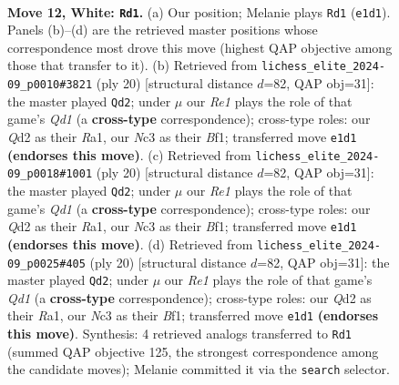 \documentclass[11pt]{article}
\begin{document}
\clearpage

\begin{figure}[p]\centering
\begin{subfigure}{0.46\textwidth}\centering
\resizebox{\linewidth}{!}{%
\newchessgame
\chessboard[
  setfen={rnb1r2k/p2nqppp/1pp1p3/3pP3/3P4/2N5/PPPQ1PPP/2K1RBNR w - - 0 12},
  showmover=false,
  pgfstyle=straightmove, color=movearrow, markmove={e1-d1}
]}
\caption{}
\end{subfigure}\hfill
\begin{subfigure}{0.46\textwidth}\centering
\resizebox{\linewidth}{!}{%
\newchessgame
\chessboard[
  setfen={rn1qkb1r/1p3p2/p2p1np1/3Pp2p/8/1N2BP2/PPP3PP/R2QKB1R w KQkq - 0 11},
  showmover=false,
  pgfstyle=straightmove, color=movearrow, markmove={d1-d2}
]}
\caption{}
\end{subfigure}
\\[4pt]
\begin{subfigure}{0.46\textwidth}\centering
\resizebox{\linewidth}{!}{%
\newchessgame
\chessboard[
  setfen={rn1qkb1r/1p3p2/p2p1np1/3Pp2p/8/1N2BP2/PPP3PP/R2QKB1R w KQkq - 0 11},
  showmover=false,
  pgfstyle=straightmove, color=movearrow, markmove={d1-d2}
]}
\caption{}
\end{subfigure}\hfill
\begin{subfigure}{0.46\textwidth}\centering
\resizebox{\linewidth}{!}{%
\newchessgame
\chessboard[
  setfen={rn1qkb1r/1p3p2/p2p1np1/3Pp2p/8/1N2BP2/PPP3PP/R2QKB1R w KQkq - 0 11},
  showmover=false,
  pgfstyle=straightmove, color=movearrow, markmove={d1-d2}
]}
\caption{}
\end{subfigure}
\caption{\textbf{Move 12, White: \texttt{Rd1}.} (a) Our position; Melanie plays \texttt{Rd1} (\texttt{e1d1}). Panels (b)--(d) are the retrieved master positions whose correspondence most drove this move (highest QAP objective among those that transfer to it). (b) Retrieved from \texttt{lichess\_elite\_2024-09\_p0010\#3821} (ply 20) [structural distance $d$=82, QAP obj=31]: the master played \texttt{Qd2}; under $\mu$ our \emph{Re1} plays the role of that game's \emph{Qd1} (a \textbf{cross-type} correspondence); cross-type roles: our \emph{Q}d2 as their \emph{R}a1, our \emph{N}c3 as their \emph{B}f1; transferred move \texttt{e1d1} \textbf{(endorses this move)}. (c) Retrieved from \texttt{lichess\_elite\_2024-09\_p0018\#1001} (ply 20) [structural distance $d$=82, QAP obj=31]: the master played \texttt{Qd2}; under $\mu$ our \emph{Re1} plays the role of that game's \emph{Qd1} (a \textbf{cross-type} correspondence); cross-type roles: our \emph{Q}d2 as their \emph{R}a1, our \emph{N}c3 as their \emph{B}f1; transferred move \texttt{e1d1} \textbf{(endorses this move)}. (d) Retrieved from \texttt{lichess\_elite\_2024-09\_p0025\#405} (ply 20) [structural distance $d$=82, QAP obj=31]: the master played \texttt{Qd2}; under $\mu$ our \emph{Re1} plays the role of that game's \emph{Qd1} (a \textbf{cross-type} correspondence); cross-type roles: our \emph{Q}d2 as their \emph{R}a1, our \emph{N}c3 as their \emph{B}f1; transferred move \texttt{e1d1} \textbf{(endorses this move)}. Synthesis: 4 retrieved analogs transferred to \texttt{Rd1} (summed QAP objective 125, the strongest correspondence among the candidate moves); Melanie committed it via the \texttt{search} selector.}

\end{figure}
\end{document}

